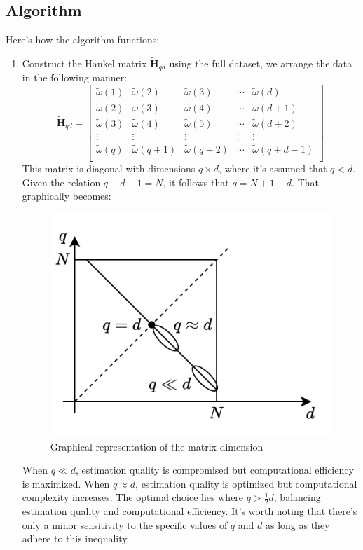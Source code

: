 \subsection{Algorithm}
Here's how the algorithm functions:
\begin{enumerate}
    \item Construct the Hankel matrix $\tilde{\mathbf{H}}_{qd}$ using the full dataset, we arrange the data in the following manner:
        \[\tilde{\mathbf{H}}_{qd}=\begin{bmatrix}
            \tilde{\omega}(1) & \tilde{\omega}(2) & \tilde{\omega}(3) & \cdots & \tilde{\omega}(d) \\ 
            \tilde{\omega}(2) & \tilde{\omega}(3) & \tilde{\omega}(4) & \cdots & \tilde{\omega}(d+1) \\ 
            \tilde{\omega}(3) & \tilde{\omega}(4) & \tilde{\omega}(5) & \cdots & \tilde{\omega}(d+2) \\ 
            \vdots & \vdots  & \vdots  & \vdots  & \vdots  \\ 
            \tilde{\omega}(q) & \tilde{\omega}(q+1) & \tilde{\omega}(q+2) & \cdots & \tilde{\omega}(q+d-1) \\ 
        \end{bmatrix}\]
        This matrix is diagonal with dimensions $q \times d$, where it's assumed that $q<d$. 
        Given the relation $q+d-1=N$, it follows that $q=N+1-d$.
        That graphically becomes: 
        \begin{figure}[H]
            \centering
            \includegraphics[width=0.4\linewidth]{images/qd.png}
            \caption{Graphical representation of the matrix dimension}
        \end{figure}
        When $q \ll d$, estimation quality is compromised but computational efficiency is maximized.
        When $q \approx d$, estimation quality is optimized but computational complexity increases.
        The optimal choice lies where $q>\frac{1}{2}d$, balancing estimation quality and computational efficiency.
        It's worth noting that there's only a minor sensitivity to the specific values of $q$ and $d$ as long as they adhere to this inequality.

\end{enumerate}
